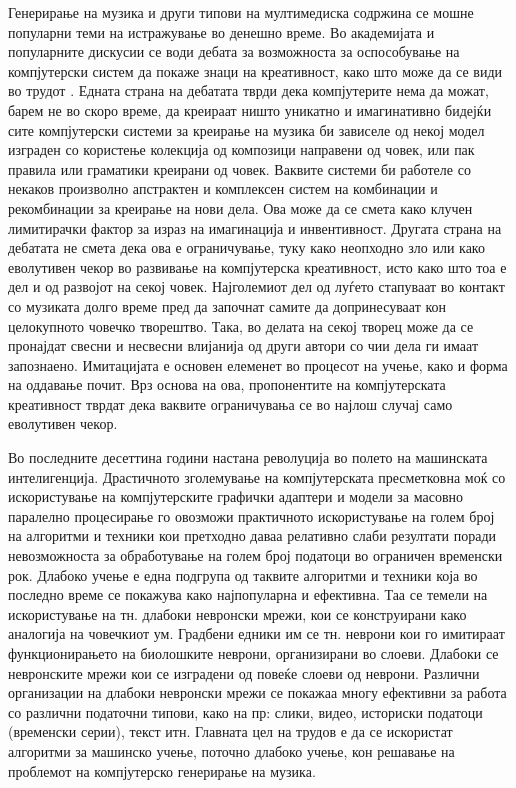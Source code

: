 Генерирање на музика и други типови на мултимедиска содржина се мошне популарни теми на истражување во денешно време. Во академијата и популарните дискусии се води дебата за возможноста за оспособување на компјутерски систем да покаже знаци на креативност, како што може да се види во трудот \cite{Ghedini2015}. Едната страна на дебатата тврди дека компјутерите нема да можат, барем не во скоро време, да креираат ништо уникатно и имагинативно бидејќи сите компјутерски системи за креирање на музика би зависеле од некој модел изграден со користење колекција од композици направени од човек, или пак правила или граматики креирани од човек. Ваквите системи би работеле со некаков произволно апстрактен и комплексен систем на комбинации и рекомбинации за креирање на нови дела. Ова може да се смета како клучен лимитирачки фактор за израз на имагинација и инвентивност. Другата страна на дебатата не смета дека ова е ограничување, туку како неопходно зло или како еволутивен чекор во развивање на компјутерска креативност, исто како што тоа е дел и од развојот на секој човек. Најголемиот дел од луѓето стапуваат во контакт со музиката долго време пред да започнат самите да допринесуваат кон целокупното човечко творештво. Така, во делата на секој творец може да се пронајдат свесни и несвесни влијанија од други автори со чии дела ги имаат запознаено. Имитацијата е основен елеменет во процесот на учење, како и форма на оддавање почит. Врз основа на ова, пропонентите на компјутерската креативност тврдат дека ваквите ограничувања се во најлош случај само еволутивен чекор.

Во последните десеттина години настана револуција во полето на машинската интелигенција. Драстичното зголемување на компјутерската пресметковна моќ со искористување на компјутерските графички адаптери и модели за масовно паралелно процесирање го овозможи практичното искористување на голем број на алгоритми и техники кои претходно даваа релативно слаби резултати поради невозможноста за обработување на голем број податоци во ограничен временски рок. Длабоко учење е една подгрупа од таквите алгоритми и техники која во последно време се покажува како најпопуларна и ефективна. Таа се темели на искористување на тн. длабоки невронски мрежи, кои се конструирани како аналогија на човечкиот ум. Градбени едники им се тн. неврони кои го имитираат функционирањето на биолошките неврони, организирани во слоеви. Длабоки се невронските мрежи кои се изградени од повеќе слоеви од неврони. Различни организации на длабоки невронски мрежи се покажаа многу ефективни за работа со различни податочни типови, како на пр: слики, видео, историски податоци (временски серии), текст итн. Главната цел на трудов е да се искористат алгоритми за машинско учење, поточно длабоко учење, кон решавање на проблемот на компјутерско генерирање на музика.

